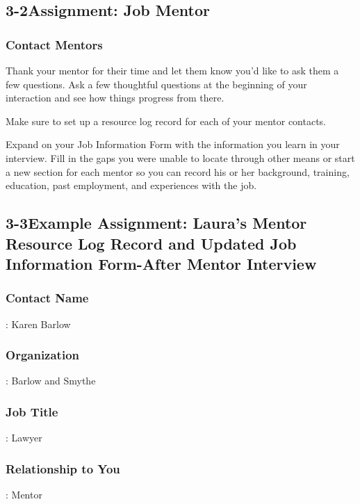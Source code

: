 \pagebreak \subsection*{3-2\quad  Assignment: Job Mentor}
\subsubsection*{Contact Mentors}
Thank your mentor for their time and let them know you'd like to ask them a few questions. Ask a few thoughtful questions at the beginning of your interaction and see how things progress from there.

Make sure to set up a resource log record for each of your mentor contacts.

Expand on your Job Information Form with the information you learn in your interview. Fill in the gaps you were unable to locate through other means or start a new section for each mentor so you can record his or her background, training, education, past employment, and experiences with the job.
\pagebreak \subsection*{3-3\quad  Example Assignment: Laura’s Mentor Resource Log Record and Updated Job Information Form-After Mentor Interview}

\subsubsection*{Contact Name}: Karen Barlow

\subsubsection*{Organization}: Barlow and Smythe

\subsubsection*{Job Title}: Lawyer

\subsubsection*{Relationship to You}: Mentor

